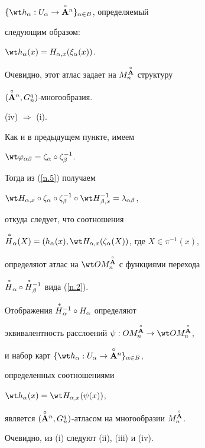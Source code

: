 \begin{pf}
$\{\wt h_\alpha : U_\alpha \to \Aon\}_{\alpha \in B}$, определяемый


следующим образом:


$\wt h_\alpha(x)=H_{\alpha,x}(\xi_{\alpha}(x))$.


Очевидно, этот атлас задает на  $M^{\overset{\circ}{\bold A}{}}_n$ структуру


$(\overset{\circ}{\bold A}{}^n,G_n^q)$-многообразия.





(iv) $\Rightarrow$ (i).


Как и в предыдущем пункте, имеем


$\wt\varphi_{\alpha\beta}=\zeta_\alpha\circ \zeta_{\beta}^{-1}$.


Тогда из (\ref{n.5}) получаем


$\wt H_{\alpha,x}\circ \zeta_{\alpha}\circ \zeta_{\beta}^{-1}\circ


\wt H{}_{\beta,x}^{-1}=\lambda_{\alpha\beta}$,


откуда следует, что соотношения


${\puts H}_\alpha(X)=(h_\alpha(x),


\wt H_{\alpha,x}(\zeta_\alpha(X))$, где $X\in \pi^{-1}(x)$,


определяют атлас на $\wt OM^{\Ao}_n$ с функциями перехода


${\overset{\,\ast}{H}{}}_{\alpha}\circ{\overset{\,\ast}{H}{}}{}_{\beta}^{-1}$ вида (\ref{n.2}).


Отображения ${\overset{\,\ast}{H}{}}{}_\alpha^{-1}\circ H_\alpha$ определяют


эквивалентность расслоений $\psi :OM^{\Ao}_n \to \wt OM^{\Ao}_n$,


и набор карт  $\{\wt h_\alpha:U_\alpha\to\Aon\}_{\alpha \in B}$,


определенных соотношениями


$\wt h_{\alpha}(x)=\wt H_{\alpha,x}(\psi (x))$,


является $(\overset{\circ}{\bold A}{}^n, G_n^q)$-атласом на многообразии $M^{\overset{\circ}{\bold A}{}}_n$.





Очевидно, из (i) следуют  (ii), (iii) и (iv).


\end{pf}








